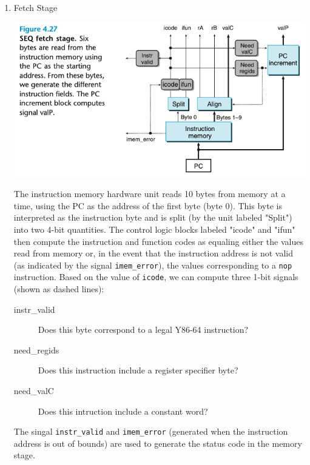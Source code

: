 \documentclass[11pt]{article}
\begin{document}
\begin{enumerate}
\item Fetch Stage
\label{sec:org3ab3d39}

\begin{center}
\includegraphics[width=.9\linewidth]{pics/figure4.27-seq-fetch-stage.png}
\end{center}

The instruction memory hardware unit reads 10 bytes from memory at a time, using the PC as the address of the first byte (byte 0). This byte is interpreted as the instruction byte and is split (by the unit labeled "Split") into two 4-bit quantities. The control logic blocks labeled "icode" and "ifun" then compute the instruction and function codes as equaling either the values read from memory or, in the event that the instruction address is not valid (as indicated by the signal \texttt{imem\_error}), the values corresponding to a \texttt{nop} instruction. Based on the value of \texttt{icode}, we can compute three 1-bit signals (shown as dashed lines):\\
\begin{description}
\item[{instr\_valid}] Does this byte correspond to a legal Y86-64 instruction?\\
\item[{need\_regids}] Does this instruction include a register specifier byte?\\
\item[{need\_valC}] Does this intruction include a constant word?\\
\end{description}

The singal \texttt{instr\_valid} and \texttt{imem\_error} (generated when the instruction address is out of bounds) are used to generate the status code in the memory stage.\\


\end{enumerate}
\end{document}
